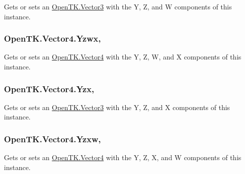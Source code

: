 Gets or sets an \hyperlink{struct_open_t_k_1_1_vector3}{Open\-T\-K.\-Vector3} with the Y, Z, and W components of this instance. 

\hypertarget{struct_open_t_k_1_1_vector4_a42fc147dd892f3f91c979e685c25365d}{
\subsubsection[{Yzwx}]{ Open\-T\-K.\-Vector4.\-Yzwx\hspace{0.3cm}{\ttfamily [get]}, {\ttfamily [set]}}}\label{struct_open_t_k_1_1_vector4_a42fc147dd892f3f91c979e685c25365d}


Gets or sets an \hyperlink{struct_open_t_k_1_1_vector4}{Open\-T\-K.\-Vector4} with the Y, Z, W, and X components of this instance. 

\hypertarget{struct_open_t_k_1_1_vector4_ad06fbcc20926c5ad868c1e825819b6f9}{
\subsubsection[{Yzx}]{ Open\-T\-K.\-Vector4.\-Yzx\hspace{0.3cm}{\ttfamily [get]}, {\ttfamily [set]}}}\label{struct_open_t_k_1_1_vector4_ad06fbcc20926c5ad868c1e825819b6f9}


Gets or sets an \hyperlink{struct_open_t_k_1_1_vector3}{Open\-T\-K.\-Vector3} with the Y, Z, and X components of this instance. 

\hypertarget{struct_open_t_k_1_1_vector4_a74f9723520cecef3af340f61f9259371}{
\subsubsection[{Yzxw}]{ Open\-T\-K.\-Vector4.\-Yzxw\hspace{0.3cm}{\ttfamily [get]}, {\ttfamily [set]}}}\label{struct_open_t_k_1_1_vector4_a74f9723520cecef3af340f61f9259371}


Gets or sets an \hyperlink{struct_open_t_k_1_1_vector4}{Open\-T\-K.\-Vector4} with the Y, Z, X, and W components of this instance. 

